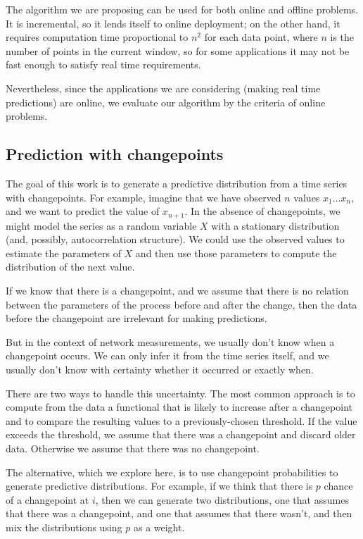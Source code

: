 \documentclass[twocolumn,11pt]{article}
\begin{document}
The algorithm we are proposing can be used for both online and offline
problems.  It is incremental, so it lends itself to online deployment;
on the other hand, it requires computation time proportional to $n^2$
for each data point, where $n$ is the number of points in the
current window, so for some applications it may not be fast enough
to satisfy real time requirements.

Nevertheless, since the applications we are considering (making real
time predictions) are online, we evaluate our algorithm by the
criteria of online problems.


\subsection{Prediction with changepoints}

The goal of this work is to generate a predictive distribution from a
time series with changepoints.  For example, imagine that we have
observed $n$ values $x_1 \ldots x_n$, and we want to predict
the value of $x_{n+1}$.  In the absence of changepoints, we might model
the series as a random variable $X$ with a stationary distribution
(and, possibly, autocorrelation structure).  We could use the observed
values to estimate the parameters of $X$ and then use those parameters
to compute the distribution of the next value.

If we know that there is a changepoint, and we assume that there is
no relation between the parameters of the process before and after
the change, then the data before the changepoint are irrelevant
for making predictions.

But in the context of network measurements, we usually don't know when
a changepoint occurs.  We can only infer it from the time series
itself, and we usually don't know with certainty whether it occurred or
exactly when.

There are two ways to handle this uncertainty.  The most common
approach is to compute from the data a functional that is likely to
increase after a changepoint and to compare the resulting values to a
previously-chosen threshold.  If the value exceeds the threshold, we
assume that there was a changepoint and discard older data.  Otherwise
we assume that there was no changepoint.

The alternative, which we explore here, is to use changepoint
probabilities to generate predictive distributions.  For example, if
we think that there is $p$ chance of a changepoint at $i$, then we
can generate two distributions, one that assumes that there was a
changepoint, and one that assumes that there wasn't, and then mix
the distributions using $p$ as a weight.
\end{document}
